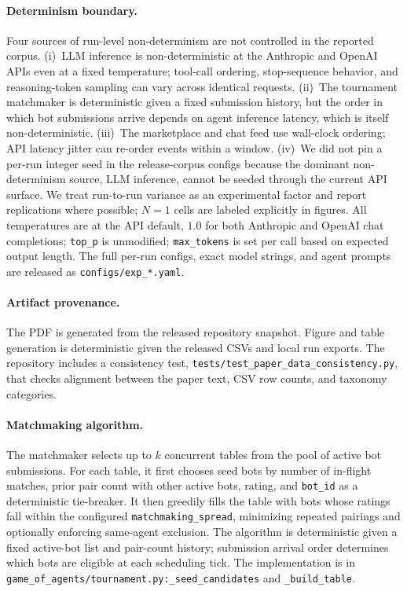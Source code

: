 \documentclass{article}
\begin{document}
\paragraph{Determinism boundary.}
Four sources of run-level non-determinism are not controlled in the reported corpus.
(i)~LLM inference is non-deterministic at the Anthropic and OpenAI APIs even at a fixed temperature; tool-call ordering, stop-sequence behavior, and reasoning-token sampling can vary across identical requests.
(ii)~The tournament matchmaker is deterministic given a fixed submission history, but the order in which bot submissions arrive depends on agent inference latency, which is itself non-deterministic.
(iii)~The marketplace and chat feed use wall-clock ordering; API latency jitter can re-order events within a window.
(iv)~We did not pin a per-run integer seed in the release-corpus configs because the dominant non-determinism source, LLM inference, cannot be seeded through the current API surface.
We treat run-to-run variance as an experimental factor and report replications where possible; $N{=}1$ cells are labeled explicitly in figures.
All temperatures are at the API default, $1.0$ for both Anthropic and OpenAI chat completions; \texttt{top\_p} is unmodified; \texttt{max\_tokens} is set per call based on expected output length.
The full per-run configs, exact model strings, and agent prompts are released as \texttt{configs/exp\_*.yaml}.

\paragraph{Artifact provenance.}
The PDF is generated from the released repository snapshot.
Figure and table generation is deterministic given the released CSVs and local run exports.
The repository includes a consistency test, \texttt{tests/test\_paper\_data\_consistency.py}, that checks alignment between the paper text, CSV row counts, and taxonomy categories.

\paragraph{Matchmaking algorithm.}
The matchmaker selects up to $k$ concurrent tables from the pool of active bot submissions.
For each table, it first chooses seed bots by number of in-flight matches, prior pair count with other active bots, rating, and \texttt{bot\_id} as a deterministic tie-breaker.
It then greedily fills the table with bots whose ratings fall within the configured \texttt{matchmaking\_spread}, minimizing repeated pairings and optionally enforcing same-agent exclusion.
The algorithm is deterministic given a fixed active-bot list and pair-count history; submission arrival order determines which bots are eligible at each scheduling tick.
The implementation is in \texttt{game\_of\_agents/tournament.py:\allowbreak \_seed\_candidates} and \texttt{\_build\_table}.
\end{document}
